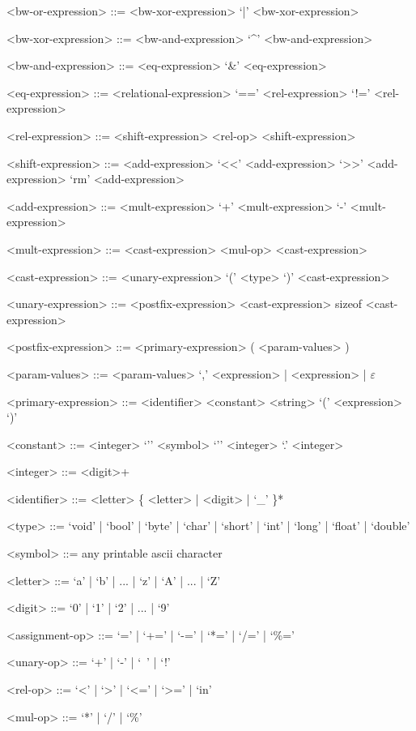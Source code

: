\documentclass[
	article,			%
	11pt,				%
	oneside,			%
	a4paper,			%
	english,			%
	brazil,				%
	sumario=tradicional
	]{abntex2}
\begin{document}
\begin{grammar}
	<bw-or-expression> ::= <bw-xor-expression>
	\alt <bw-or-expression> `|' <bw-xor-expression>
	
	<bw-xor-expression> ::= <bw-and-expression>
	\alt <bw-xor-expression> `^' <bw-and-expression>
	
	<bw-and-expression> ::= <eq-expression>
	\alt <bw-and-expression> `&' <eq-expression>
	
	<eq-expression> ::= <relational-expression>
	\alt <eq-expression> `==' <rel-expression>
	\alt <eq-expression> `!=' <rel-expression>
	
	<rel-expression> ::= <shift-expression>
	\alt <rel-expression> <rel-op> <shift-expression>
	
	<shift-expression> ::= <add-expression>
	\alt <shift-expression> `<<' <add-expression>
	\alt <shift-expression> `>>' <add-expression>
	\alt <shift-expression> `rm' <add-expression>
	
	<add-expression> ::= <mult-expression>
	\alt <add-expression> `+' <mult-expression>
	\alt <add-expression> `-' <mult-expression>
	
	<mult-expression> ::= <cast-expression>
	\alt <mult-expression> <mul-op> <cast-expression>
	
	<cast-expression> ::= <unary-expression>
	\alt `(' <type> `)' <cast-expression>
	
	<unary-expression> ::= <postfix-expression>
	\alt <unary-op> <cast-expression>
	\alt sizeof <cast-expression>
	
	<postfix-expression> ::= <primary-expression>
	\alt <postfix-expression> ( <param-values> )
		
	<param-values> ::= <param-values> `,' <expression> | <expression> | $\varepsilon$
	
	<primary-expression> ::= <identifier>
	\alt <constant>
	\alt <string>
	\alt `(' <expression> `)'
	
	<constant> ::= <integer>
	\alt `'' <symbol> `''
	\alt <integer> `.' <integer>
	
	<integer> ::= <digit>+
	
	<identifier> ::= <letter> \{ <letter> | <digit> | `_' \}*

	<type> ::= `void' | `bool' | `byte' | `char' | `short' | `int' | `long' | `float' | `double'
	
	<symbol> ::= any printable ascii character

	<letter> ::= `a' | `b' | ... | `z' | `A' | ... | `Z'
	
	<digit> ::= `0' | `1' | `2' | ... | `9'
	
	<assignment-op> ::= `=' | `+=' | `-=' | `*=' | `/=' | `\%='
	
	<unary-op> ::= `+' | `-' | `~' | `!'
	
	<rel-op> ::= `<' | `>' | `<=' | `>=' | `in'
	
	<mul-op> ::= `*' | `/' | `\%'
	
\end{grammar}
\end{document}
